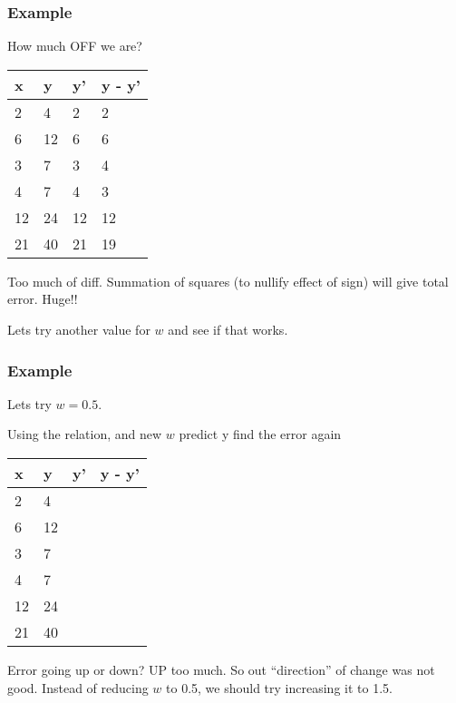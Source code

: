 \begin{frame}[fragile]\frametitle{Example}

How much OFF we are?

	\begin{table}[!h]
		\centering
		\begin{tabular}{| l | l | l| l|}
			\hline
			x & y & y' & y - y'\\ \hline
			2 & 4  & 2 & 2\\ \hline
			6 & 12 & 6 & 6\\ \hline
			3 & 7  & 3 & 4\\ \hline
			4 & 7 & 4 & 3\\ \hline
			12 & 24 & 12 & 12\\ \hline
			21 & 40 & 21 & 19 \\ \hline			
		\end{tabular}
\end{table}

Too much of diff. Summation of squares (to nullify effect of sign) will give total error. Huge!!

Lets try another value for $w$ and see if that works.

\end{frame}

\begin{frame}[fragile]\frametitle{Example}

Lets try  $w = 0.5$.

Using the relation, and new $w$ predict y find the error again

	\begin{table}[!h]
		\centering
		\begin{tabular}{| l | l | l| l|}
			\hline
			x & y & y' & y - y'\\ \hline
			2 & 4  & \\ \hline
			6 & 12 & \\ \hline
			3 & 7  & \\ \hline
			4 & 7 & \\ \hline
			12 & 24 & \\ \hline
			21 & 40 & \\ \hline			
		\end{tabular}
\end{table}

Error going up or down? UP too much. So out ``direction'' of change was not good. Instead of reducing $w$ to 0.5, we should try increasing it to 1.5.

\end{frame}


